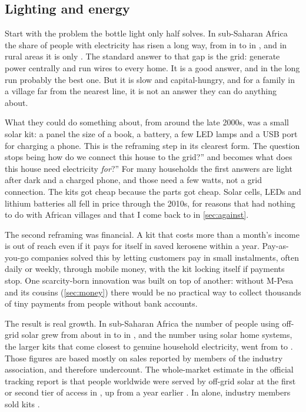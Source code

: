 \subsection{Lighting and energy}
\label{sec:lighting}

Start with the problem the bottle light only half solves. In sub-Saharan
Africa the share of people with electricity has risen a long way, from
\sspElecAccessStart{} in \sspElecStartYear{} to \sspElecAccess{} in
\sspElecYear{}, and in rural areas it is only \sspRuralElecAccess{}
\parencite{worldbank_wdi}. The standard answer to that gap is the grid:
generate power centrally and run wires to every home. It is a good answer, and
in the long run probably the best one. But it is slow and capital-hungry, and
for a family in a village far from the nearest line, it is not an answer they
can do anything about.

What they could do something about, from around the late 2000s, was a small
solar kit: a panel the size of a book, a battery, a few LED lamps and a USB
port for charging a phone. This is the reframing step in its clearest form.
The question stops being how do we connect this house to the grid?'' and
becomes what does this house need electricity \emph{for}?'' For many
households the first answers are light after dark and a charged phone, and
those need a few watts, not a grid connection. The kits got cheap because the
parts got cheap. Solar cells, LEDs and lithium batteries all fell in price
through the 2010s, for reasons that had nothing to do with African villages
and that I come back to in \cref{sec:against}.

The second reframing was financial. A kit that costs more than a month's
income is out of reach even if it pays for itself in saved kerosene within a
year. Pay-as-you-go companies solved this by letting customers pay in small
instalments, often daily or weekly, through mobile money, with the kit locking
itself if payments stop. One scarcity-born innovation was built on top of
another: without M-Pesa and its cousins (\cref{sec:money}) there would be no
practical way to collect thousands of tiny payments from people without bank
accounts.

The result is real growth. In sub-Saharan Africa the number of people using
off-grid solar grew from about \sspSolarUsersStart{} in \sspSolarStartYear{}
to \sspSolarUsers{} in \sspSolarYear{}, and the number using solar home
systems, the larger kits that come closest to genuine household electricity,
went from \sspShsUsersStart{} to \sspShsUsers{}
\parencite{irena2025offgrid}. Those figures are based mostly on sales reported
by members of the industry association, and therefore undercount. The
whole-market estimate in the official tracking report is that
\sdgOffgridServed{} people worldwide were served by off-grid solar at the
first or second tier of access in \sspSolarYear{}, up from
\sdgOffgridServedPrev{} a year earlier \parencite{esmap2026sdg7}. In
\goglaYear{} alone, industry members sold \goglaKitsSold{} kits
\parencite{gogla2026}.

